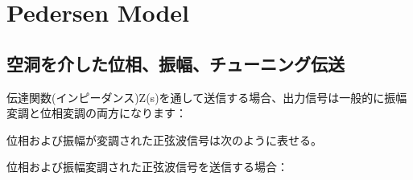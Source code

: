 \documentclass[book]{jlreq}
\begin{document}
\clearpage

\section{Pedersen Model}
\subsection{空洞を介した位相、振幅、チューニング伝送}



伝達関数(インピーダンス)Z(s)を通して送信する場合、出力信号は一般的に振幅変調と位相変調の両方になります：



位相および振幅が変調された正弦波信号は次のように表せる。




位相および振幅変調された正弦波信号を送信する場合：
\end{document}
